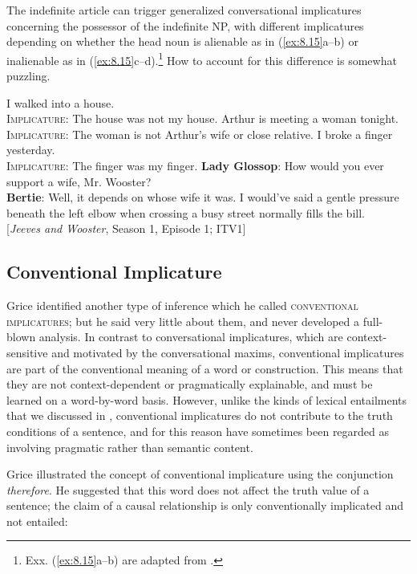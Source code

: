 The indefinite article can trigger generalized conversational implicatures concerning the possessor of the indefinite NP, with different implicatures depending on whether the head noun is alienable as in (\ref{ex:8.15}a--b) or inalienable as in (\ref{ex:8.15}c--d).\footnote{Exx. (\ref{ex:8.15}a--b) are adapted from \citet[56]{Grice1975}.} How to account for this difference is somewhat puzzling.


\ea \label{ex:8.15}
\ea  I walked into a house.\\
\textsc{Implicature}: The house was not my house.
\ex Arthur is meeting a woman tonight.\\
\textsc{Implicature}: The woman is not Arthur’s wife or close relative.
 \ex   I broke a finger yesterday.\\
\textsc{Implicature}: The finger was my finger.
\ex  \textbf{Lady Glossop}: How would you ever support a wife, Mr. Wooster?\\
\textbf{Bertie}: Well, it depends on whose wife it was. I would’ve said a gentle pressure beneath the left elbow when crossing a busy street normally fills the bill.\\
{}[\textit{Jeeves and Wooster}, Season 1, Episode 1; ITV1]
\z
\z

\subsection{Conventional Implicature}\label{sec:8.4.2}

Grice identified another type of inference which he called \textsc{conventional implicatures}; but he said very little about them, and never developed a full-blown analysis. In contrast to conversational implicatures, which are context-sensitive and motivated by the conversational maxims, conventional implicatures are part of the conventional meaning of a word or construction. This means that they are not context-dependent or pragmatically explainable, and must be learned on a word-by-word basis. However, unlike the kinds of lexical entailments that we discussed in , conventional implicatures do not contribute to the truth conditions of a sentence, and for this reason have sometimes been regarded as involving pragmatic rather than semantic content.



Grice illustrated the concept of conventional implicature using the conjunction \textit{therefore}. He suggested that this word does not affect the truth value of a sentence; the claim of a causal relationship is only conventionally implicated and not entailed:


